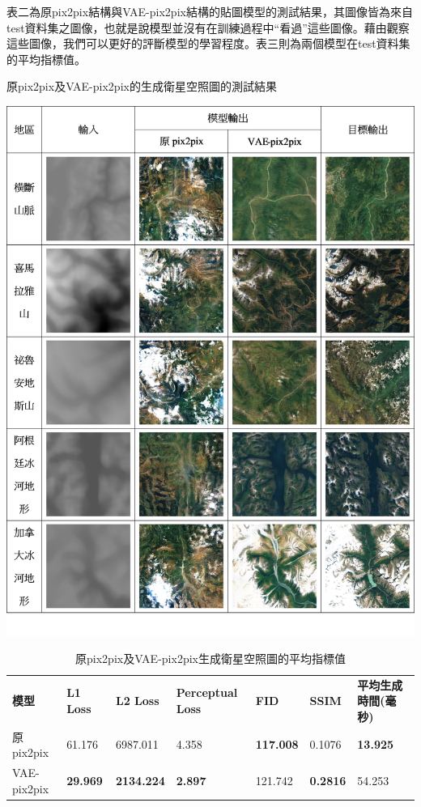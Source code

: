 \documentclass[a4paper, 12pt]{article}
\begin{document}
表二為原pix2pix結構與VAE-pix2pix結構的貼圖模型的測試結果，其圖像皆為來自test資料集之圖像，也就是說模型並沒有在訓練過程中“看過”這些圖像。藉由觀察這些圖像，我們可以更好的評斷模型的學習程度。表三則為兩個模型在test資料集的平均指標值。

\begin{table}[htbp]
    \centering
    \caption{原pix2pix及VAE-pix2pix的生成衛星空照圖的測試結果}
    \label{tab:2}
    \includegraphics[width=0.8\linewidth]{fig/tab2.jpg}
\end{table}

\begin{table}[htbp]
    \caption{原pix2pix及VAE-pix2pix生成衛星空照圖的平均指標值}
    \label{tab:3}
    \begin{tabularx}{\linewidth}{|Y|Y|Y|Y|Y|Y|Y|}
        \hline
        \textbf{模型} & \textbf{L1 Loss} & \textbf{L2 Loss} & \textbf{Perceptual Loss} & \textbf{FID}    & \textbf{SSIM} & \textbf{平均生成時間(毫秒)} \\ \hhline{|=|=|=|=|=|=|=|}
        原pix2pix     & 61.176            & 6987.011         & 4.358 & \textbf{117.008} & 0.1076         & \textbf{13.925}              \\ \hline
        VAE-pix2pix   & \textbf{29.969}  & \textbf{2134.224} & \textbf{2.897}          & 121.742        & \textbf{0.2816} & 54.253                      \\ \hline
    \end{tabularx}
\end{table}
\end{document}
